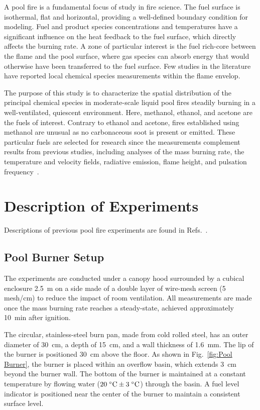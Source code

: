 \documentclass[12pt]{article}
\begin{document}
A pool fire is a fundamental focus of study in fire science. The fuel surface is isothermal, flat and horizontal, providing a well-defined boundary condition for modeling. Fuel and product species concentrations and temperatures have a significant influence on the heat feedback to the fuel surface, which directly affects the burning rate. A zone of particular interest is the fuel rich-core between the flame and the pool surface, where gas species can absorb energy that would otherwise have been transferred to the fuel surface. Few studies in the literature have reported local chemical species measurements within the flame envelop.

The purpose of this study is to characterize the spatial distribution of the principal chemical species in moderate-scale liquid pool fires steadily burning in a well-ventilated, quiescent environment. Here, methanol, ethanol, and acetone are the fuels of interest. Contrary to ethanol and acetone, fires established using methanol are unusual as no carbonaceous soot is present or emitted. These particular fuels are selected for research since the measurements complement results from previous studies, including analyses of the mass burning rate, the temperature and velocity fields, radiative emission, flame height, and pulsation frequency~\cite{Fisher1987,Hamins2016}.


\clearpage

\section{Description of Experiments}
\label{sec:Experiments}

Descriptions of previous pool fire experiments are found in Refs.~\cite{Hamins2016,Hamins1994,Hamins1991,Hamins1996,Lock2008}.

\subsection{Pool Burner Setup}
\label{ssec:Pool_Burner_Setup}

The experiments are conducted under a canopy hood surrounded by a cubical enclosure 2.5~m on a side made of a double layer of wire-mesh screen (5 mesh/cm) to reduce the impact of room ventilation. All measurements are made once the mass burning rate reaches a steady-state, achieved approximately 10~min after ignition.

The circular, stainless-steel burn pan, made from cold rolled steel, has an outer diameter of 30~cm, a depth of 15~cm, and a wall thickness of 1.6~mm. The lip of the burner is positioned 30~cm above the floor. As shown in Fig.~\ref{fig:Pool Burner}, the burner is placed within an overflow basin, which extends 3~cm beyond the burner wall.  The bottom of the burner is maintained at a constant temperature by flowing water ($20 \; ^\circ \hbox{C} \pm 3 \; ^\circ \hbox{C}$) through the basin. A fuel level indicator is positioned near the center of the burner to maintain a consistent surface level.
\end{document}
